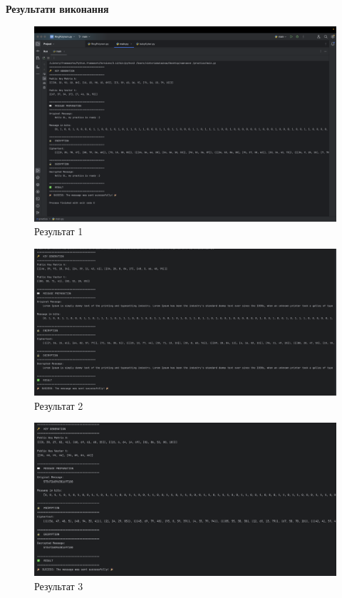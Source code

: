 \textbf{Результати виконання}
\begin{figure}[h]
    \centering
    \includegraphics[width=\textwidth]{ПРАКТИКА/Images/test_1.png}
    \caption{Результат 1}
\end{figure}

\begin{figure}[h]
    \centering
    \includegraphics[width=\textwidth]{ПРАКТИКА/Images/test_2.png}
    \caption{Результат 2}
\end{figure}

\begin{figure}[h]
    \centering
    \includegraphics[width=\textwidth]{ПРАКТИКА/Images/test_3.png}
    \caption{Результат 3}
\end{figure}

